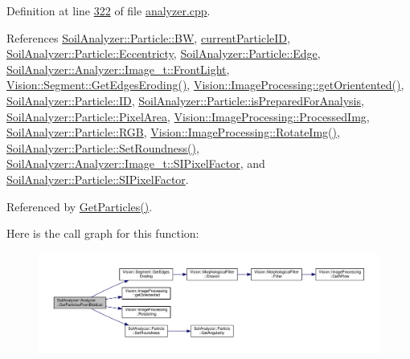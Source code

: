 Definition at line \hyperlink{analyzer_8cpp_source_l00322}{322} of file \hyperlink{analyzer_8cpp_source}{analyzer.\+cpp}.



References \hyperlink{particle_8h_source_l00042}{Soil\+Analyzer\+::\+Particle\+::\+B\+W}, \hyperlink{analyzer_8h_source_l00068}{current\+Particle\+I\+D}, \hyperlink{particle_8h_source_l00053}{Soil\+Analyzer\+::\+Particle\+::\+Eccentricty}, \hyperlink{particle_8h_source_l00043}{Soil\+Analyzer\+::\+Particle\+::\+Edge}, \hyperlink{analyzer_8h_source_l00040}{Soil\+Analyzer\+::\+Analyzer\+::\+Image\+\_\+t\+::\+Front\+Light}, \hyperlink{_segment_8cpp_source_l00483}{Vision\+::\+Segment\+::\+Get\+Edges\+Eroding()}, \hyperlink{_image_processing_8cpp_source_l00048}{Vision\+::\+Image\+Processing\+::get\+Orientented()}, \hyperlink{particle_8h_source_l00040}{Soil\+Analyzer\+::\+Particle\+::\+I\+D}, \hyperlink{particle_8h_source_l00067}{Soil\+Analyzer\+::\+Particle\+::is\+Prepared\+For\+Analysis}, \hyperlink{particle_8h_source_l00052}{Soil\+Analyzer\+::\+Particle\+::\+Pixel\+Area}, \hyperlink{_image_processing_8h_source_l00064}{Vision\+::\+Image\+Processing\+::\+Processed\+Img}, \hyperlink{particle_8h_source_l00044}{Soil\+Analyzer\+::\+Particle\+::\+R\+G\+B}, \hyperlink{_image_processing_8cpp_source_l00070}{Vision\+::\+Image\+Processing\+::\+Rotate\+Img()}, \hyperlink{particle_8cpp_source_l00089}{Soil\+Analyzer\+::\+Particle\+::\+Set\+Roundness()}, \hyperlink{analyzer_8h_source_l00042}{Soil\+Analyzer\+::\+Analyzer\+::\+Image\+\_\+t\+::\+S\+I\+Pixel\+Factor}, and \hyperlink{particle_8h_source_l00051}{Soil\+Analyzer\+::\+Particle\+::\+S\+I\+Pixel\+Factor}.



Referenced by \hyperlink{analyzer_8cpp_source_l00303}{Get\+Particles()}.



Here is the call graph for this function\+:
\nopagebreak
\begin{figure}[H]
\begin{center}
\leavevmode
\includegraphics[width=350pt]{class_soil_analyzer_1_1_analyzer_acfe01406c180dd154fefbe13e7f18a4d_cgraph}
\end{center}
\end{figure}




